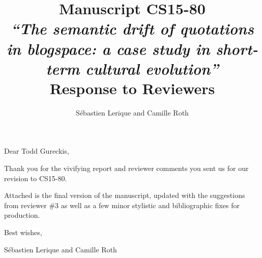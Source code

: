 \documentclass[a4paper,10pt]{article}
\title{Manuscript CS15-80\medskip\\
{\Large\em``The semantic drift of quotations in blogspace: a case study in short-term cultural evolution''}
\bigskip\\Response to Reviewers
}
\author{Sébastien Lerique and Camille Roth}
\begin{document}
\maketitle

\makeatletter
\renewcommand{\subsection}{\clearpage\@startsection{section}{1}{0mm}
{\baselineskip}{\baselineskip\medskip\hrule\medskip}{\raggedright\Large\bf~\textcolor{MidnightBlue}}}
\makeatother


\newcommand{\critique}[1]{\begin{quote}#1\end{quote}}
\newcommand{\answer}[1]{{\setlength{\parindent}{0pt}\par\color{blue} #1}}
\newcommand{\tb}[1]{\textcolor{blue}{#1}}
\newcommand{\answerok}[1]{{\setlength{\parindent}{0pt}\par\color{MidnightBlue} #1}}
\newcommand{\unclear}[1]{\textcolor{red}{\sf [C: #1]}}

\vspace{3cm}
Dear Todd Gureckis,

\bigskip
Thank you for the vivifying report and reviewer comments you sent us for our revision to CS15-80.

\medskip
Attached is the final version of the manuscript, updated with the suggestions from reviewer \#3 as well as a few minor stylistic and bibliographic fixes for production.

\bigskip
Best wishes,

\bigskip
Sébastien Lerique and Camille Roth
\end{document}
